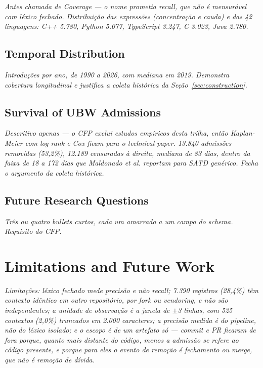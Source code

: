 \documentclass[10pt,conference]{IEEEtran}
\begin{document}
\textit{Antes chamada de \emph{Coverage} --- o nome prometia recall, que não é
mensurável com léxico fechado. Distribuição das expressões (concentração e
cauda) e das 42 linguagens: C++ 5.780, Python 5.077, TypeScript 3.247, C 3.023,
Java 2.780.}

\subsection{Temporal Distribution}

\textit{Introduções por ano, de 1990 a 2026, com mediana em 2019. Demonstra
cobertura longitudinal e justifica a coleta histórica da
Seção~\ref{sec:construction}.}

\subsection{Survival of UBW Admissions}

\textit{Descritivo apenas --- o CFP exclui estudos empíricos desta trilha, então
Kaplan-Meier com log-rank e Cox ficam para o technical paper. 13.840 admissões
removidas (53,2\%), 12.189 censuradas à direita, mediana de 83 dias, dentro da
faixa de 18 a 172 dias que Maldonado et al. reportam para SATD genérico. Fecha o
argumento da coleta histórica.}

\subsection{Future Research Questions}

\textit{Três ou quatro bullets curtos, cada um amarrado a um campo do schema.
Requisito do CFP.}

\section{Limitations and Future Work}
\label{sec:limitations}

\textit{Limitações: léxico fechado mede precisão e não recall; 7.390 registros
(28,4\%) têm contexto idêntico em outro repositório, por fork ou vendoring, e
não são independentes; a unidade de observação é a janela de \(\pm\)3 linhas,
com 525 contextos (2,0\%) truncados em 2.000 caracteres; a precisão medida é do
pipeline, não do léxico isolado; e o escopo é de um artefato só --- commit e PR
ficaram de fora porque, quanto mais distante do código, menos a admissão se
refere ao código presente, e porque para eles o evento de remoção é fechamento
ou merge, que não é remoção de dívida.}
\end{document}
